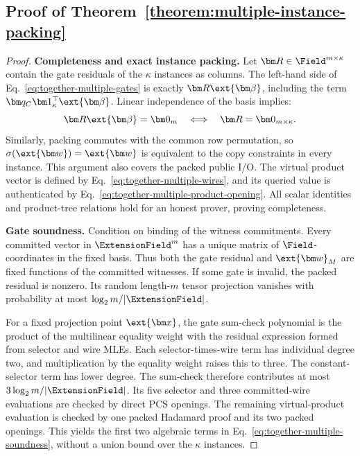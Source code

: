 \subsection{Proof of Theorem~\ref{theorem:multiple-instance-packing}}
\label{appx:proof-multiple-instance}

\begin{proof}
\noindent\textbf{Completeness and exact instance packing.}
Let \(\bm R\in\Field^{m\times\kappa}\) contain the gate
residuals of the \(\kappa\) instances as columns.
The left-hand side of Eq.~\eqref{eq:together-multiple-gates}
is exactly \(\bm R\ext{\bm\beta}\), including the term
\(\bm q_C\bm1_\kappa^\top\ext{\bm\beta}\).
Linear independence of the basis implies:
\[
    \bm R\ext{\bm\beta}=\bm0_m
       \quad\Longleftrightarrow\quad
    \bm R=\bm0_{m\times\kappa}.
\]
Similarly, packing commutes with the common row permutation,
so \(\sigma(\ext{\bm w})=\ext{\bm w}\) is equivalent to
the copy constraints in every instance.
This argument also covers the packed public I/O.
The virtual product vector is defined by
Eq.~\eqref{eq:together-multiple-wires}, and its queried value
is authenticated by Eq.~\eqref{eq:together-multiple-product-opening}.
All scalar identities and product-tree relations hold for an
honest prover, proving completeness.

\noindent\textbf{Gate soundness.}
Condition on binding of the witness commitments.
Every committed vector in \(\ExtensionField^m\) has a unique
matrix of \(\Field\)-coordinates in the fixed basis.
Thus both the gate residual and \(\ext{\bm w}_M\) are fixed
functions of the committed witnesses.
If some gate is invalid, the packed residual is nonzero.
Its random length-\(m\) tensor projection vanishes with
probability at most \(\log_2m/|\ExtensionField|\).

For a fixed projection point \(\ext{\bm x}\), the gate
sum-check polynomial is the product of the multilinear equality
weight with the residual expression formed from selector and wire
MLEs. Each selector-times-wire term has individual degree two,
and multiplication by the equality weight raises this to three.
The constant-selector term has lower degree.
The sum-check therefore contributes at most
\(3\log_2m/|\ExtensionField|\).
Its five selector and three committed-wire evaluations are
checked by direct PCS openings.
The remaining virtual-product evaluation is checked by one
packed Hadamard proof and its two packed openings.
This yields the first two algebraic terms in
Eq.~\eqref{eq:together-multiple-soundness}, without a union
bound over the \(\kappa\) instances.


\end{proof}
